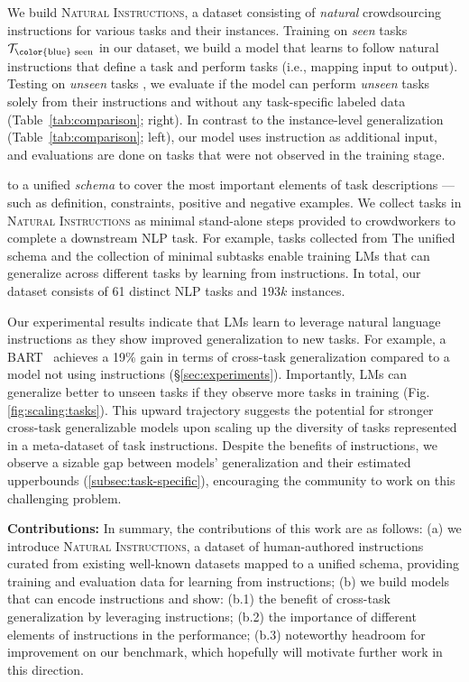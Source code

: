 We build \textsc{Natural Instructions}, a dataset consisting of {\it natural} crowdsourcing instructions for various tasks and their instances. Training on {\it seen} tasks $\text{$\mathcal{T}_{\textnormal{\color{blue} seen}}$}$ in our dataset, we  build a model that learns to follow natural instructions that define a task and perform tasks  (i.e., mapping input to output). Testing on \emph{unseen} tasks , we evaluate if the model can perform {\it unseen} tasks  solely from their instructions and without any task-specific labeled data   (Table~\ref{tab:comparison}; right). In contrast to the instance-level generalization (Table~\ref{tab:comparison}; left), our model uses instruction as additional input, and evaluations are done on tasks that were not observed in the training stage. 

to a unified {\it schema} to cover the most important elements of task descriptions --- such as definition, constraints, positive and negative examples. We collect tasks in  \textsc{Natural Instructions}  as minimal stand-alone steps provided to crowdworkers to complete a downstream NLP task. For example, tasks collected from The unified schema and the collection of minimal subtasks enable training LMs that can generalize across different tasks by learning from instructions. In total, our dataset consists of 61 distinct NLP tasks and $193k$ instances.

Our experimental results indicate that LMs learn to leverage natural language instructions as they show improved generalization to new tasks. For example, a BART~\cite{lewis2019bart}  achieves a 19\% gain in terms of cross-task generalization compared to a model not using instructions
(\S\ref{sec:experiments}). 
Importantly, LMs can generalize better to unseen tasks if they observe more tasks in training (Fig.\ref{fig:scaling:tasks}). 
This upward trajectory suggests the potential for stronger cross-task generalizable models upon scaling up the diversity of tasks represented in a meta-dataset of task instructions. Despite the benefits of instructions, we observe a sizable gap between models' generalization and their estimated upperbounds (\ref{subsec:task-specific}), encouraging the community to work on this challenging problem. 

\textbf{Contributions:} In summary, the contributions of this work are as follows: (a) we introduce \textsc{Natural Instructions}, a  dataset of human-authored instructions  curated from existing well-known datasets mapped to a unified schema, providing training and evaluation data for learning from instructions; (b) we build models that can encode instructions and show: (b.1) the benefit of cross-task generalization by leveraging instructions; (b.2) the importance of different elements of instructions in the performance; (b.3) noteworthy headroom for improvement on our benchmark, which hopefully will motivate further work in this direction. 

